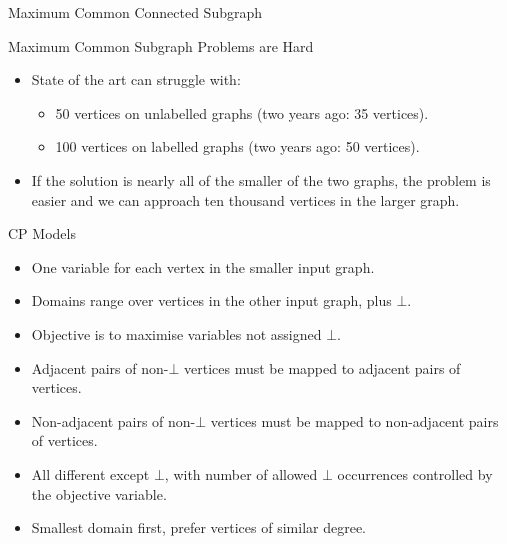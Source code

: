 \documentclass{beamer}
\begin{document}
\begin{frame}{Maximum Common Connected Subgraph}
\end{frame}

\begin{frame}{Maximum Common Subgraph Problems are Hard}
    \begin{itemize}
        \item State of the art can struggle with:
            \begin{itemize}
                \item 50 vertices on unlabelled graphs (two years ago: 35 vertices).
                \item 100 vertices on labelled graphs (two years ago: 50 vertices).
            \end{itemize}
        \item If the solution is nearly all of the smaller of the two graphs, the problem is easier
            and we can approach ten thousand vertices in the larger graph.
    \end{itemize}
\end{frame}

\begin{frame}{CP Models}
    \begin{itemize}
        \item One variable for each vertex in the smaller input graph.
        \item Domains range over vertices in the other input graph, plus $\bot$.
        \item Objective is to maximise variables not assigned $\bot$.
        \item Adjacent pairs of non-$\bot$ vertices must be mapped to adjacent pairs of vertices.
        \item Non-adjacent pairs of non-$\bot$ vertices must be mapped to non-adjacent pairs of vertices.
        \item All different except $\bot$, with number of allowed $\bot$ occurrences controlled by
            the objective variable.
        \item Smallest domain first, prefer vertices of similar degree.
    \end{itemize}
\end{frame}
\end{document}
